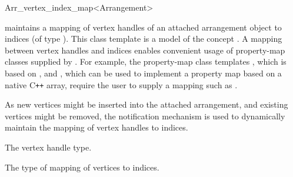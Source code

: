 
\ccRefPageBegin

\begin{ccRefClass}{Arr_vertex_index_map<Arrangement>}
\label{arr_ref:arr_vertex_index_map}

\ccDefinition

\ccClassTemplateName{} maintains a mapping of vertex handles of an
attached arrangement object to indices (of type ).
This class template is a model of the \boost{} concept
. A mapping between vertex handles and indices
enables convenient usage of property-map classes supplied by \boost{}.
For example, the property-map class templates
, which is based on ,
and , which can be used to implement
a property map based on a native C\hbox{\tt ++} array, require the
user to supply a mapping such as \ccClassTemplateName{}.

As new vertices might be inserted into the attached arrangement, and
existing vertices might be removed, the notification mechanism is used
to dynamically maintain the mapping of vertex handles to indices.


\ccIsModel
  
\ccInheritsFrom{}


\ccTypes


\ccGlue
{}
\ccGlue
{}
\ccGlue
{}

    {The vertex handle type.}

    {The type of mapping of vertices to indices.}


\end{ccRefClass}
